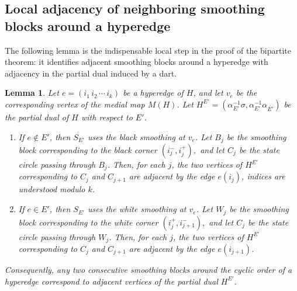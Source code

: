 \documentclass{article}
\newtheorem{lemma}[theorem]{Lemma}
\begin{document}
\subsection{Local adjacency of neighboring smoothing blocks around a hyperedge}

The following lemma is the indispensable local step in the proof of the bipartite theorem: it identifies adjacent smoothing blocks around a hyperedge with adjacency in the partial dual induced by a dart.

\begin{lemma}\label{lem:adjacent-blocks}
Let \(e=(i_1\,i_2\,\cdots\,i_k)\) be a hyperedge of \(H\), and let \(v_e\) be the corresponding vertex of the medial map \(M(H)\). Let \(H^{E'}=(\alpha_{E'}^{-1}\sigma,\alpha_{E'}^{-1}\alpha_{\overline{E'}})\) be the partial dual of \(H\) with respect to \(E'\).

\begin{enumerate}
\item If \(e\notin E'\), then \(S_{E'}\) uses the black smoothing at \(v_e\).
Let \(B_j\) be the smoothing block corresponding to the black corner
\(
(i_j^-,i_j^+),
\)
and let \(C_j\) be the state circle passing through \(B_j\). Then, for each
\(j\), the two vertices of \(H^{E'}\) corresponding to \(C_j\) and \(C_{j+1}\)
are adjacent by the edge \(e(i_j)\), indices are understood modulo \(k\).

\item If \(e\in E'\), then \(S_{E'}\) uses the white smoothing at \(v_e\).
Let \(W_j\) be the smoothing block corresponding to the white corner
\(
(i_j^+,i_{j+1}^-),
\)
and let \(C_j\) be the state circle passing through \(W_j\). Then, for each
\(j\), the two vertices of \(H^{E'}\) corresponding to \(C_j\) and \(C_{j+1}\)
are adjacent by the edge \(e(i_{j+1})\). 
\end{enumerate}

Consequently, any two consecutive smoothing blocks around the
cyclic order of a hyperedge correspond to adjacent vertices of the
partial dual \(H^{E'}\).
\end{lemma}
\end{document}
